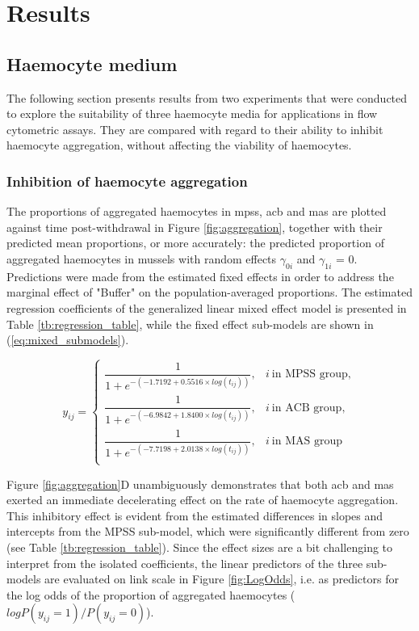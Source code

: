 \chapter{Results}
\label{chap:results_method_development}

\section{Haemocyte medium}
The following section presents results from two experiments that were conducted to explore the suitability of three haemocyte media for applications in flow cytometric assays. They are compared with regard to their ability to inhibit haemocyte aggregation, without affecting the viability of haemocytes.

\subsection{Inhibition of haemocyte aggregation}
The proportions of aggregated haemocytes in \acrshort{mpss}, \acrshort{acb} and \acrshort{mas} are plotted against time post-withdrawal in Figure \ref{fig:aggregation}, together with their predicted mean proportions, or more accurately: the predicted proportion of aggregated haemocytes in mussels with random effects $\gamma_{0i}$ and $\gamma_{1i}$ = 0. Predictions were made from the estimated fixed effects in order to address the marginal effect of "Buffer" on the population-averaged proportions. The estimated regression coefficients of the generalized linear mixed effect model is presented in Table \ref{tb:regression_table}, while the fixed effect sub-models are shown in (\ref{eq:mixed_submodels}).

\begin{equation}
    \label{eq:mixed_submodels}
    y_{ij} = \begin{cases}
        \dfrac{1}{1 + e^{-(-1.7192 + 0.5516 \times log(t_{ij}))}},  & i \: \text{in MPSS group}, \\
        \dfrac{1}{1 + e^{-(-6.9842 + 1.8400 \times log(t_{ij}))}},  & i \: \text{in ACB group}, \\
        \dfrac{1}{1 + e^{-(-7.7198 + 2.0138 \times log(t_{ij}))}},  & i \: \text{in MAS group} \\
    \end{cases}
\end{equation}

Figure \ref{fig:aggregation}D unambiguously demonstrates that both \acrshort{acb} and \acrshort{mas} exerted an immediate decelerating effect on the rate of haemocyte aggregation. This inhibitory effect is evident from the estimated differences in slopes and intercepts from the MPSS sub-model, which were significantly different from zero (see Table \ref{tb:regression_table}). Since the effect sizes are a bit challenging to interpret from the isolated coefficients, the linear predictors of the three sub-models are evaluated on link scale in Figure \ref{fig:LogOdds}, i.e. as predictors for the log odds of the proportion of aggregated haemocytes ($log P(y_{ij} = 1) / P(y_{ij} = 0)$).

